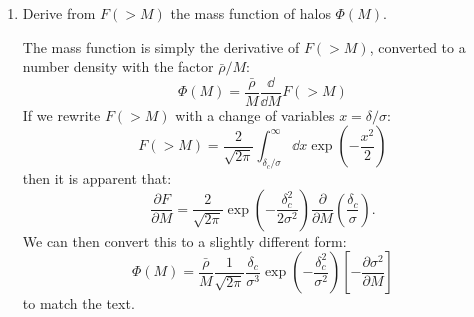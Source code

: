 \begin{enumerate}
\begin{enumerate}
\item Derive from $F(>M)$ the mass function of halos $\Phi(M)$. 
\begin{answer}
    The mass function is simply the derivative of $F(>M)$,
    converted to a number density with the factor $\bar{\rho}/M$:
    \begin{equation}
    \Phi(M) =
        \frac{\bar{\rho}}{M} \frac{\dd{}}{\dd{M}} F(>M)
    \end{equation}
    If we rewrite $F(>M)$ with a change of variables $x=\delta/\sigma$:
    \begin{equation}
    F(>M) = \frac{2}{\sqrt{2\pi}} \int_{\delta_c/\sigma}^\infty \dd{x}
                          \exp\left(-\frac{x^2}{2}\right)
    \end{equation}
    then it is apparent that:
    \begin{equation}
    \frac{\partial F}{\partial M}
    = \frac{2}{\sqrt{2\pi}} \exp\left(-\frac{\delta_c^2}{2\sigma^2}\right)
    \frac{\partial}{\partial M}\left(\frac{\delta_c}{\sigma}\right).
    \end{equation}
    We can then convert this to a slightly different form:
    \begin{equation}
    \Phi(M) = \frac{\bar{\rho}}{M}
    \frac{1}{\sqrt{2\pi}} \frac{\delta_c}{\sigma^3}
    \exp\left(-\frac{\delta_c^2}{\sigma^2}\right)
    \left[ - \frac{\partial \sigma^2}{\partial M}\right]
    \end{equation}
    to match the text.
\end{answer}


\end{enumerate}
\end{enumerate}
